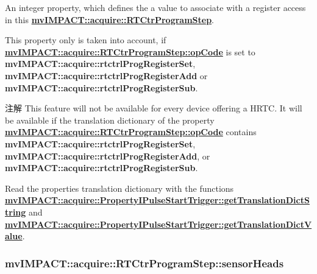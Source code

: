 An integer property, which defines the a value to associate with a register access in this {\bfseries \hyperlink{classmv_i_m_p_a_c_t_1_1acquire_1_1_r_t_ctr_program_step}{mv\+I\+M\+P\+A\+C\+T\+::acquire\+::\+R\+T\+Ctr\+Program\+Step}}. 

This property only is taken into account, if {\bfseries \hyperlink{classmv_i_m_p_a_c_t_1_1acquire_1_1_r_t_ctr_program_step_a823c9cad26ad628155d68130ad1d6d5d}{mv\+I\+M\+P\+A\+C\+T\+::acquire\+::\+R\+T\+Ctr\+Program\+Step\+::op\+Code}} is set to {\bfseries mv\+I\+M\+P\+A\+C\+T\+::acquire\+::rtctrl\+Prog\+Register\+Set}, {\bfseries mv\+I\+M\+P\+A\+C\+T\+::acquire\+::rtctrl\+Prog\+Register\+Add} or {\bfseries mv\+I\+M\+P\+A\+C\+T\+::acquire\+::rtctrl\+Prog\+Register\+Sub}.

\begin{DoxyNote}{注解}
This feature will not be available for every device offering a H\+R\+T\+C. It will be available if the translation dictionary of the property {\bfseries \hyperlink{classmv_i_m_p_a_c_t_1_1acquire_1_1_r_t_ctr_program_step_a823c9cad26ad628155d68130ad1d6d5d}{mv\+I\+M\+P\+A\+C\+T\+::acquire\+::\+R\+T\+Ctr\+Program\+Step\+::op\+Code}} contains {\bfseries mv\+I\+M\+P\+A\+C\+T\+::acquire\+::rtctrl\+Prog\+Register\+Set}, {\bfseries mv\+I\+M\+P\+A\+C\+T\+::acquire\+::rtctrl\+Prog\+Register\+Add}, or {\bfseries mv\+I\+M\+P\+A\+C\+T\+::acquire\+::rtctrl\+Prog\+Register\+Sub}.
\end{DoxyNote}
Read the properties translation dictionary with the functions {\bfseries \hyperlink{classmv_i_m_p_a_c_t_1_1acquire_1_1_enum_property_i_af5ec5a9c3657af2917f4ead78ef067db}{mv\+I\+M\+P\+A\+C\+T\+::acquire\+::\+Property\+I\+Pulse\+Start\+Trigger\+::get\+Translation\+Dict\+String}} and {\bfseries \hyperlink{classmv_i_m_p_a_c_t_1_1acquire_1_1_enum_property_i_a0c50700ebff2806621c63d03b624f200}{mv\+I\+M\+P\+A\+C\+T\+::acquire\+::\+Property\+I\+Pulse\+Start\+Trigger\+::get\+Translation\+Dict\+Value}}. \hypertarget{classmv_i_m_p_a_c_t_1_1acquire_1_1_r_t_ctr_program_step_a1bdc2bfbec5bd9680753a3aa3d6ed483}{
\subsubsection[{sensor\+Heads}]{ mv\+I\+M\+P\+A\+C\+T\+::acquire\+::\+R\+T\+Ctr\+Program\+Step\+::sensor\+Heads}}\label{classmv_i_m_p_a_c_t_1_1acquire_1_1_r_t_ctr_program_step_a1bdc2bfbec5bd9680753a3aa3d6ed483}



